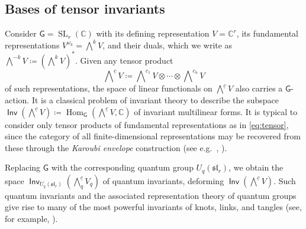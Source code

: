 \documentclass{amsart}
\theoremstyle{definition}
\theoremstyle{remark}
\numberwithin{equation}{section}
\DeclareMathOperator{\SL}{SL}
\newcommand{\fsl}{\mathfrak{sl}}
\DeclareMathOperator{\Inv}{\mathsf{Inv}}
\DeclareMathOperator{\Hom}{\mathrm{Hom}}
\begin{document}
\subsection{Bases of tensor invariants}\label{sec:intro_bases}
Consider $\mathsf{G} = \SL_r(\mathbb{C})$  with its defining representation $V = \mathbb{C}^r$, its fundamental representations $V^{\omega_k} = \bigwedge^k V$, and their duals, which we write as $\bigwedge^{-k} V \coloneqq (\bigwedge^k V)^*$.
Given any tensor product 
\begin{equation}\label{eq:tensor}
    \bigwedge\nolimits^{\underline{c}} V \coloneqq \bigwedge\nolimits^{c_1} V \otimes \cdots \otimes \bigwedge\nolimits^{c_n} V
\end{equation}
of such representations, the space of linear functionals on $\bigwedge\nolimits^{\underline{c}} V$ also carries a $\mathsf{G}$-action. It is a classical problem of invariant theory to describe the subspace $\Inv(\bigwedge\nolimits^{\underline{c}} V) \coloneqq \Hom_\mathsf{G}(\bigwedge\nolimits^{\underline{c}} V, \mathbb{C})$ of invariant multilinear forms. It is typical to consider only tensor products of fundamental representations as in \eqref{eq:tensor}, since the category of all finite-dimensional representations may be recovered from these through the \emph{Karoubi envelope} construction (see e.g.~\cite[\S3.3.1]{Morrison}, \cite[\S3.1]{Cautis-Kamnitzer-Morrison}).  

Replacing $\mathsf{G}$ with the corresponding quantum group $U_q(\fsl_r)$, we obtain the space $\Inv_{U_q(\fsl_r)}(\bigwedge\nolimits_q^{\underline{c}} V_q)$ of quantum invariants, deforming $\Inv(\bigwedge\nolimits^{\underline{c}} V)$. Such quantum invariants and the associated representation theory of quantum groups give rise to many of the most powerful invariants of knots, links, and tangles (see, for example, \cite{Jones,Kauffman,Turaev,Khovanov:Jones,Khovanov:sl3,Morrison.Nieh}).
\end{document}
